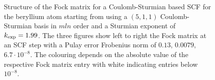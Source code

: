 \begin{figure}
	\centering
	\caption{Structure of the Fock matrix for a Coulomb-Sturmian based SCF
		for the beryllium atom starting from using a $(5,1,1)$
		Coulomb-Sturmian basis in $mln$ order
		and a Sturmian exponent of $k_\text{exp} = 1.99$.
		The three figures show left to right the Fock matrix
		at an SCF step with a Pulay error Frobenius norm of
		$0.13$, $0.0079$, $6.7 \cdot 10^{-8}$.
		The colouring depends on the absolute value
		of the respective Fock matrix entry
		with white indicating entries below $10^{-8}$.
		}
	\label{fig:StructureSturmianFock}
\end{figure}




